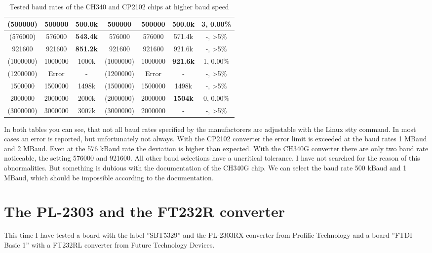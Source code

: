\begin{table}[H]
\begin{center}
\begin{tabular}{| c | c | c || c | c | c || c |}
    \hline
    (500000) &  500000  &  500.0k   &  500000   & 500000 & 500.0k    &   3, 0.00\%  \\
    \hline
    (576000) &  576000 & \bf{543.4k} &  576000   & 576000 & 571.4k   &   -, >5\%  \\
    \hline
     921600  &  921600  &  \bf{851.2k} & 921600 & 921600 & 921.6k    &   -, >5\%  \\
    \hline
    (1000000) & 1000000  &  1000k    & (1000000) & 1000000 & \bf{921.6k}  &   1, 0.00\%  \\
    \hline
    (1200000) &  Error   &   -       & (1200000) & Error   &   -       &  -, >5\%  \\
    \hline
    1500000  & 1500000  &  1498k    & (1500000) & 1500000 & 1498k   &  -, >5\%  \\
    \hline
    2000000  & 2000000  &  2000k    & (2000000) & 2000000 & \bf{1504k}    & 0, 0.00\%  \\
    \hline
   (3000000) & 3000000   & 3007k    & (3000000) & 2000000 &   -       &  -, >5\%   \\
    \hline
    \end{tabular}
  \end{center}
  \caption{Tested baud rates of the CH340 and CP2102 chips at higher baud speed}
  \label{tab:CH340baudh}
\end{table}

In both tables you can see, that not all baud rates specified by the manufactorers
are adjustable with the Linux stty command.
In most cases an error is reported, but unfortunately not always.
With the CP2102 converter the error limit is exceeded at the baud rates 1 MBaud and 2 MBaud.
Even at the 576 kBaud rate the deviation is higher than expected.
With the CH340G converter there are only two baud rate noticeable, the setting 576000 and 921600.
All other baud selections have a uncritical tolerance.
I have not searched for the reason of this abnormalities.
But something is dubious with the documentation of the CH340G chip. 
We can select the baud rate 500 kBaud and 1 MBaud, which should be impossible
according to the documentation.


\section{The PL-2303 and the FT232R converter}
This time I have tested a board with the label ''SBT5329'' and the PL-2303RX converter from Profilic Technology
and a board ''FTDI Basic 1'' with a FT232RL converter from Future Technology Devices.

